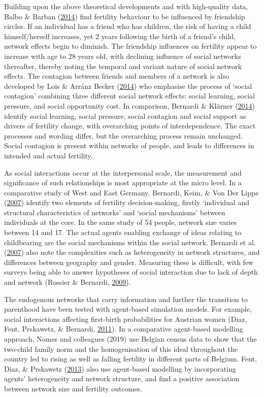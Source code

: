 \documentclass[12pt,twoside]{reedthesis}
\begin{document}
Building upon the above theoretical developments and with high-quality data, Balbo \& Barban (\protect\hyperlink{ref-balbo2014}{2014}) find fertility behaviour to be influenced by friendship circles. If an individual has a friend who has children, the risk of having a child himself/herself increases, yet 2 years following the birth of a friend's child, network effects begin to diminish. The friendship influences on fertility appear to increase with age to 28 years old, with declining influence of social networks thereafter, thereby noting the temporal and variant nature of social network effects. The contagion between friends and members of a network is also developed by Lois \& Arránz Becker (\protect\hyperlink{ref-lois2014}{2014}) who emphasise the process of `social contagion' combining three different social network effects: social learning, social pressure, and social opportunity cost. In comparison, Bernardi \& Klärner (\protect\hyperlink{ref-bernardi2014}{2014}) identify social learning, social pressure, social contagion and social support as drivers of fertility change, with overarching points of interdependence. The exact processes and wording differ, but the overarching process remain unchanged. Social contagion is present within networks of people, and leads to differences in intended and actual fertility.

As social interactions occur at the interpersonal scale, the measurement and significance of such relationships is most appropriate at the micro level. In a comparative study of West and East Germany, Bernardi, Keim, \& Von Der Lippe (\protect\hyperlink{ref-bernardi2007}{2007}) identify two elements of fertility decision-making, firstly `individual and structural characteristics of networks' and `social mechanisms' between individuals at the core. In the same study of 54 people, network size varies between 14 and 17. The actual agents enabling exchange of ideas relating to childbearing are the social mechanisms within the social network. Bernardi et al. (\protect\hyperlink{ref-bernardi2007}{2007}) also note the complexities such as heterogeneity in network structures, and differences between geography and gender. Measuring these is difficult, with few surveys being able to answer hypotheses of social interaction due to lack of depth and network (Rossier \& Bernardi, \protect\hyperlink{ref-rossier2009}{2009}).

The endogenous networks that carry information and further the transition to parenthood have been tested with agent-based simulation models. For example, social interactions affecting first-birth probabilities for Austrian women (Diaz, Fent, Prskawetz, \& Bernardi, \protect\hyperlink{ref-diaz2011}{2011}). In a comparative agent-based modelling approach, Nomes and colleagues (2019) use Belgian census data to show that the two-child family norm and the homogenisation of this ideal throughout the country led to rising as well as falling fertility in different parts of Belgium. Fent, Diaz, \& Prskawetz (\protect\hyperlink{ref-fent2013}{2013}) also use agent-based modelling by incorporating agents' heterogeneity and network structure, and find a positive association between network size and fertility outcomes.
\end{document}
